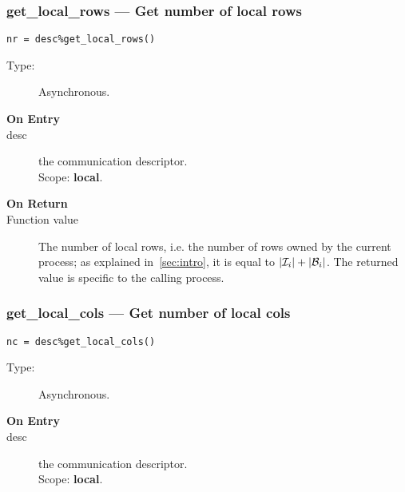 \subsubsection{get\_local\_rows --- Get number of local rows}

\begin{verbatim}
nr = desc%get_local_rows()
\end{verbatim}

\begin{description}
\item[Type:] Asynchronous.
\item[\bf On Entry]
\item[desc] the communication descriptor.\\
Scope: {\bf local}.\\
\end{description}

\begin{description}
\item[\bf On Return]
\item[Function value] The number of local rows, i.e. the number of
  rows owned by the current process; as explained in~\ref{sec:intro},
  it is equal to $|{\cal I}_i| + |{\cal B}_i|$. The returned value is
  specific to the calling process. 
\end{description}


\subsubsection{get\_local\_cols --- Get number of local cols}

\begin{verbatim}
nc = desc%get_local_cols()
\end{verbatim}

\begin{description}
\item[Type:] Asynchronous.
\item[\bf On Entry]
\item[desc] the communication descriptor.\\
Scope: {\bf local}.\\
\end{description}

